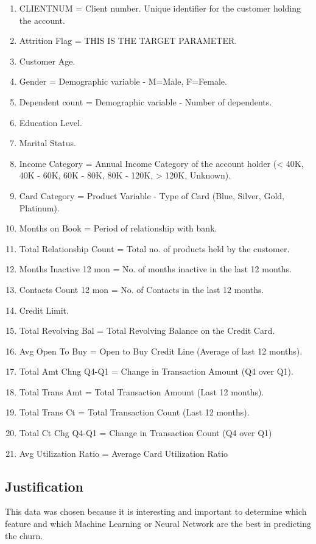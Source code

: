 \documentclass{homeworg}
\begin{document}
\begin{enumerate}
    \item CLIENTNUM = Client number. Unique identifier for the customer holding the account.
    \item Attrition Flag = THIS IS THE TARGET PARAMETER.
    \item Customer Age.
    \item Gender = Demographic variable - M=Male, F=Female.
    \item Dependent count = Demographic variable - Number of dependents.
    \item Education Level.
    \item Marital Status.
    \item Income Category = Annual Income Category of the account holder (< 40K, 40K - 60K,  60K - 80K,  80K - 120K, > 120K, Unknown).
    \item Card Category = Product Variable - Type of Card (Blue, Silver, Gold, Platinum).
    \item Months on Book = Period of relationship with bank.
    \item Total Relationship Count = Total no. of products held by the customer.
    \item Months Inactive 12 mon = No. of months inactive in the last 12 months.
    \item Contacts Count 12 mon = No. of Contacts in the last 12 months.
    \item Credit Limit.
    \item Total Revolving Bal = Total Revolving Balance on the Credit Card.
    \item Avg Open To Buy = Open to Buy Credit Line (Average of last 12 months).
    \item Total Amt Chng Q4-Q1 = Change in Transaction Amount (Q4 over Q1).
    \item Total Trans Amt = Total Transaction Amount (Last 12 months).
    \item Total Trans Ct = Total Transaction Count (Last 12 months).
    \item Total Ct Chg Q4-Q1 = Change in Transaction Count (Q4 over Q1)
    \item Avg Utilization Ratio = Average Card Utilization Ratio
\end{enumerate}

\subsection{Justification}
This data was chosen because it is interesting and important to determine which feature and which Machine Learning or Neural Network are the best in predicting the churn.
\end{document}
